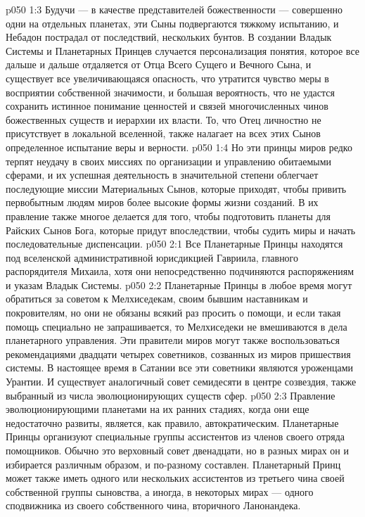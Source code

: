 \vs p050 1:3 Будучи --- в качестве представителей божественности --- совершенно одни на отдельных планетах, эти Сыны подвергаются тяжкому испытанию, и Небадон пострадал от последствий, нескольких бунтов. В создании Владык Системы и Планетарных Принцев случается персонализация понятия, которое все дальше и дальше отдаляется от Отца Всего Сущего и Вечного Сына, и существует все увеличивающаяся опасность, что утратится чувство меры в восприятии собственной значимости, и большая вероятность, что не удастся сохранить истинное понимание ценностей и связей многочисленных чинов божественных существ и иерархии их власти. То, что Отец личностно не присутствует в локальной вселенной, также налагает на всех этих Сынов определенное испытание веры и верности.
\vs p050 1:4 Но эти принцы миров редко терпят неудачу в своих миссиях по организации и управлению обитаемыми сферами, и их успешная деятельность в значительной степени облегчает последующие миссии Материальных Сынов, которые приходят, чтобы привить первобытным людям миров более высокие формы жизни созданий. В их правление также многое делается для того, чтобы подготовить планеты для Райских Сынов Бога, которые придут впоследствии, чтобы судить миры и начать последовательные диспенсации.
\vs p050 2:1 Все Планетарные Принцы находятся под вселенской административной юрисдикцией Гавриила, главного распорядителя Михаила, хотя они непосредственно подчиняются распоряжениям и указам Владык Системы.
\vs p050 2:2 Планетарные Принцы в любое время могут обратиться за советом к Мелхиседекам, своим бывшим наставникам и покровителям, но они не обязаны всякий раз просить о помощи, и если такая помощь специально не запрашивается, то Мелхиседеки не вмешиваются в дела планетарного управления. Эти правители миров могут также воспользоваться рекомендациями двадцати четырех советников, созванных из миров пришествия системы. В настоящее время в Сатании все эти советники являются уроженцами Урантии. И существует аналогичный совет семидесяти в центре созвездия, также выбранный из числа эволюционирующих существ сфер.
\vs p050 2:3 Правление эволюционирующими планетами на их ранних стадиях, когда они еще недостаточно развиты, является, как правило, автократическим. Планетарные Принцы организуют специальные группы ассистентов из членов своего отряда помощников. Обычно это верховный совет двенадцати, но в разных мирах он и избирается различным образом, и по\hyp{}разному составлен. Планетарный Принц может также иметь одного или нескольких ассистентов из третьего чина своей собственной группы сыновства, а иногда, в некоторых мирах --- одного сподвижника из своего собственного чина, вторичного Ланонандека.
